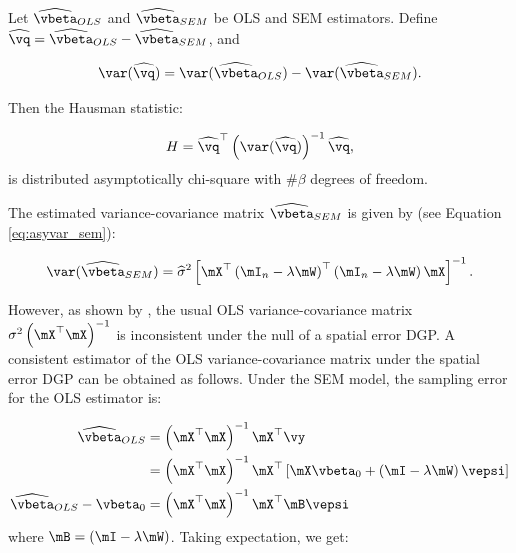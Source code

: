 \documentclass[english,12pt]{book}\usepackage[]{graphicx}\usepackage[]{xcolor}
\begin{document}
\begin{definition} 
Let $\widehat{\vbeta}_{OLS}$ and $\widehat{\vbeta}_{SEM}$ be OLS and SEM estimators. Define $\widehat{\vq} = \widehat{\vbeta}_{OLS}-\widehat{\vbeta}_{SEM}$, and

\begin{equation}
\var(\widehat{\vq})=\var(\widehat{\vbeta}_{OLS}) - \var(\widehat{\vbeta}_{SEM}).
\end{equation}

Then the Hausman statistic:

\begin{equation}
H=\widehat{\vq}^\top\left(\var(\widehat{\vq})\right)^{-1}\widehat{\vq}, 
\end{equation}
%
is distributed asymptotically chi-square with $\#\beta$ degrees of freedom.
\end{definition}

The estimated variance-covariance matrix $\widehat{\vbeta}_{SEM}$ is given by (see Equation \ref{eq:asyvar_sem}):

\begin{equation}
\var(\widehat{\vbeta}_{SEM})=\widehat{\sigma}^2\left[\mX^\top\left(\mI_n-\lambda\mW\right)^\top\left(\mI_n-\lambda\mW\right)\mX\right]^{-1}.
\end{equation}

However, as shown by \cite{cordy1993efficiency}, the usual OLS variance-covariance matrix $\sigma^2\left(\mX^\top\mX\right)^{-1}$ is inconsistent under the null of a spatial error DGP. A consistent estimator of the OLS variance-covariance matrix under the spatial error DGP can be obtained as follows. Under the SEM model, the sampling error for the OLS estimator is:
    
    \begin{equation*}
      \begin{aligned}
        \widehat{\vbeta}_{OLS} & =\left(\mX^\top\mX\right)^{-1}\mX^\top\vy \\
                         & = \left(\mX^\top\mX\right)^{-1}\mX^\top\left[\mX\vbeta_0 + \left(\mI - \lambda\mW\right)\vepsi\right]\\
         \widehat{\vbeta}_{OLS} -\vbeta_0 & =   \left(\mX^\top\mX\right)^{-1}\mX^\top\mB\vepsi            
      \end{aligned}
    \end{equation*}
    where $\mB = \left(\mI - \lambda\mW\right)$. Taking expectation, we get:
    
\end{document}
